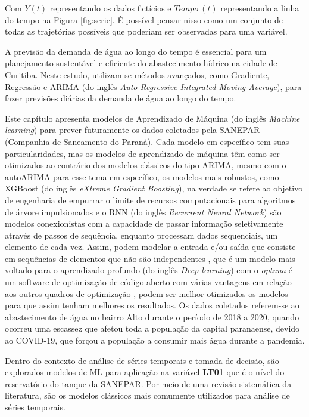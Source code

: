 Com $Y(t)$ representando os dados fictícios e $Tempo \ (t)$ representando a linha do tempo na Figura \ref{fig:serie}.
É possível pensar nisso como um conjunto de todas as trajetórias possíveis que poderiam ser observadas para uma variável.



A previsão da demanda de água ao longo do tempo é essencial para um planejamento sustentável e eficiente do abastecimento hídrico na cidade de Curitiba. Neste estudo, utilizam-se métodos avançados, como Gradiente, Regressão e ARIMA (do inglês \textit{Auto-Regressive Integrated Moving Average}), para fazer previsões diárias da demanda de água ao longo do tempo.


Este capítulo apresenta modelos de Aprendizado de Máquina (do inglês \textit{Machine learning}) para prever futuramente os dados coletados pela SANEPAR (Companhia de Saneamento do Paraná). Cada modelo em específico tem suas particularidades, mas os modelos de aprendizado de máquina têm como ser otimizados ao contrário dos modelos clássicos do tipo ARIMA, mesmo com o autoARIMA para esse tema em específico, os modelos mais robustos, como XGBoost (do inglês \textit{eXtreme Gradient Boosting}), na verdade se refere ao objetivo de engenharia de empurrar o limite de recursos computacionais para algoritmos de árvore impulsionados \cite{xgboost_intro} e o RNN (do inglês \textit{Recurrent Neural Network}) são modelos conexionistas com a capacidade de passar informação seletivamente através de passos de sequência, enquanto processam dados sequenciais, um elemento de cada vez. Assim, podem modelar a entrada e/ou saída que consiste em sequências de elementos que não são independentes \cite{rnn}, que é um modelo mais voltado para o aprendizado profundo (do inglês \textit{Deep learning}) com o \textit{optuna} é um software de optimização de código aberto com várias vantagens em relação aos outros quadros de optimização \cite{Hanifi2022}, podem ser melhor otimizados os modelos para que assim tenham melhores os resultados. Os dados coletados referem-se ao abastecimento de água no bairro Alto durante o período de 2018 a 2020, quando ocorreu uma escassez que afetou toda a população da capital paranaense, devido ao COVID-19, que forçou a população a consumir mais água durante a pandemia.

Dentro do contexto de análise de séries temporais e tomada de decisão, são explorados modelos de ML para aplicação na variável \textbf{LT01} que é o nível do reservatório do tanque da SANEPAR. Por meio de uma revisão sistemática da literatura, são os modelos clássicos mais comumente utilizados para análise de séries temporais.

